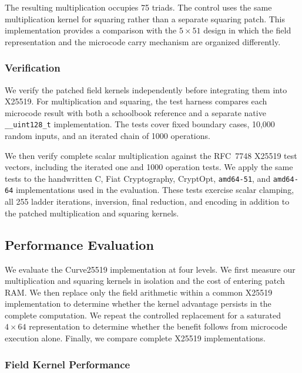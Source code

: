\documentclass[journal=tches,submission]{iacrtrans}
\newcommand{\code}[1]{\texttt{#1}}
\begin{document}
The resulting multiplication occupies 75 triads.
The control uses the same multiplication kernel for squaring rather than a separate squaring patch.
This implementation provides a comparison with the $5\times51$ design in which the field representation and the microcode carry mechanism are organized differently.

\subsubsection{Verification}
\label{sec:c25519-verification}

We verify the patched field kernels independently before integrating them into X25519.
For multiplication and squaring, the test harness compares each microcode result with both a schoolbook reference and a separate native \code{\_\_uint128\_t} implementation.
The tests cover fixed boundary cases, 10,000 random inputs, and an iterated chain of 1000 operations.

We then verify complete scalar multiplication against the RFC~7748 X25519 test vectors, including the iterated one and 1000 operation tests.
We apply the same tests to the handwritten C, Fiat Cryptography, CryptOpt, \texttt{amd64-51}, and \texttt{amd64-64} implementations used in the evaluation.
These tests exercise scalar clamping, all 255 ladder iterations, inversion, final reduction, and encoding in addition to the patched multiplication and squaring kernels.

\subsection{Performance Evaluation}
\label{sec:c-perf}

We evaluate the Curve25519 implementation at four levels.
We first measure our multiplication and squaring kernels in isolation and the cost of entering patch RAM.
We then replace only the field arithmetic within a common X25519 implementation to determine whether the kernel advantage persists in the complete computation.
We repeat the controlled replacement for a saturated $4\times64$ representation to determine whether the benefit follows from microcode execution alone.
Finally, we compare complete X25519 implementations.

\subsubsection{Field Kernel Performance}
\label{sec:c25519-kernel-results}
\end{document}
